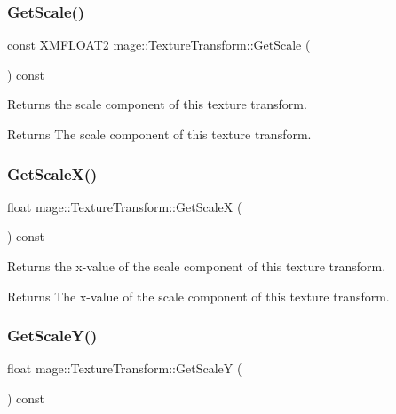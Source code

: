 \subsubsection{\texorpdfstring{Get\+Scale()}{GetScale()}}
{\footnotesize\ttfamily const X\+M\+F\+L\+O\+A\+T2 mage\+::\+Texture\+Transform\+::\+Get\+Scale (\begin{DoxyParamCaption}{ }\end{DoxyParamCaption}) const\hspace{0.3cm}{\ttfamily [noexcept]}}

Returns the scale component of this texture transform.

\begin{DoxyReturn}{Returns}
The scale component of this texture transform. 
\end{DoxyReturn}
\hypertarget{structmage_1_1_texture_transform_a93c8747e04566b2273f23a4ae99efd21}{}\label{structmage_1_1_texture_transform_a93c8747e04566b2273f23a4ae99efd21} 
\subsubsection{\texorpdfstring{Get\+Scale\+X()}{GetScaleX()}}
{\footnotesize\ttfamily float mage\+::\+Texture\+Transform\+::\+Get\+ScaleX (\begin{DoxyParamCaption}{ }\end{DoxyParamCaption}) const\hspace{0.3cm}{\ttfamily [noexcept]}}

Returns the x-\/value of the scale component of this texture transform.

\begin{DoxyReturn}{Returns}
The x-\/value of the scale component of this texture transform. 
\end{DoxyReturn}
\hypertarget{structmage_1_1_texture_transform_a414577d7c8bea3c655fe20cb24c5f91b}{}\label{structmage_1_1_texture_transform_a414577d7c8bea3c655fe20cb24c5f91b} 
\subsubsection{\texorpdfstring{Get\+Scale\+Y()}{GetScaleY()}}
{\footnotesize\ttfamily float mage\+::\+Texture\+Transform\+::\+Get\+ScaleY (\begin{DoxyParamCaption}{ }\end{DoxyParamCaption}) const\hspace{0.3cm}{\ttfamily [noexcept]}}

